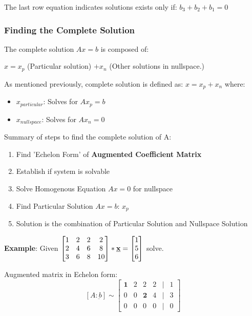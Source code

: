 \documentclass[10pt,a4paper]{article}
\begin{document}
	The last row equation indicates solutions exists only if:
	$b_3+b_2+b_1=0$

	\subsubsection{Finding the Complete Solution}
	The complete solution $Ax=b$ is composed of: \par 
	\begin{center}
		$x = x_p$ (Particular solution) $+ x_n$ (Other
	solutions in nullspace.)
	\end{center}
	As mentioned previously, complete solution is defined as: $x=x_p + x_n$ where:
	\begin{itemize}
		\item $x_{particular}$: Solves for $Ax_p=b$
		\item $x_{nullspace}$: Solves for $Ax_n=0$
	\end{itemize}
	\begin{tcolorbox}[breakable,colback=white,colframe=black,width=\dimexpr\textwidth+12mm\relax,enlarge left by=-6mm]
		Summary of steps to find the complete solution of A:
	\begin{enumerate}
		\item Find 'Echelon Form' of \textbf{Augmented Coefficient Matrix}
		\item Establish if system is solvable
		\item Solve Homogenous Equation $Ax=0$ for nullspace
		\item Find Particular Solution $Ax=b$: $x_p$
		\item Solution is the combination of Particular Solution and Nullspace Solution
	\end{enumerate}
	\end{tcolorbox}
	\textbf{Example}: Given $\begin{bmatrix}
		1 & 2 & 2 & 2 \\ 
		2 & 4 & 6 & 8 \\ 
		3 & 6 & 8 & 10
		\end{bmatrix}*\textbf{\underbar{x}} = \begin{bmatrix}
		1\\ 
		5\\ 
		6
		\end{bmatrix}$ solve. \par 
		Augmented matrix in Echelon form:
		$$[A:\underbar{b}]\sim
		\begin{bmatrix}
			\textbf{1} & 2 & 2 & 2 & | & 1\\ 
			0 & 0 & \textbf{2} & 4 & | & 3\\ 
			0 & 0 & 0 & 0 & | & 0
		\end{bmatrix}$$
\end{document}
